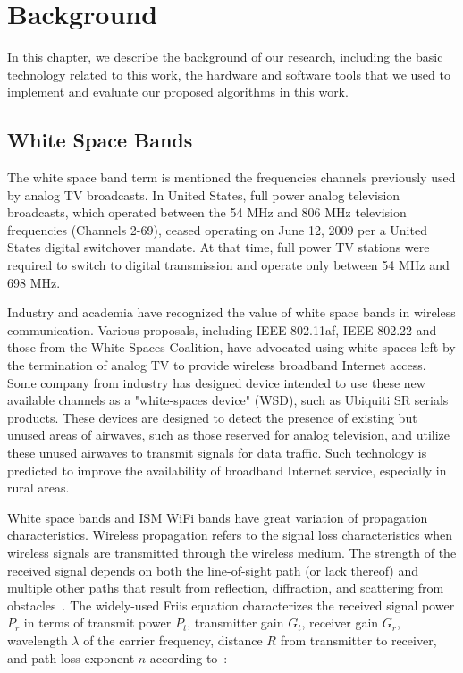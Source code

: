 \chapter{Background} 
\label{ch:background}

In this chapter, we describe the background of our research, 
including the basic technology related to this work, the 
hardware and software tools that we used to implement and evaluate 
our proposed algorithms in this work.


\section{White Space Bands}

The white space band term is mentioned the frequencies channels 
previously used by analog TV broadcasts. In United States, full 
power analog television broadcasts, which operated between the 
54 MHz and 806 MHz television frequencies (Channels 2-69), ceased 
operating on June 12, 2009 per a United States digital switchover 
mandate. At that time, full power TV stations were required to 
switch to digital transmission and operate only between 54 MHz 
and 698 MHz.~\cite{fccwhitespace} 

Industry and academia have recognized the value of white space 
bands in wireless communication. Various proposals, including 
IEEE 802.11af, IEEE 802.22 and those from the White Spaces 
Coalition, have advocated using white spaces left by the termination 
of analog TV to provide wireless broadband Internet access. Some 
company from industry has designed device intended to use these 
new available channels as a "white-spaces device" (WSD), such as 
Ubiquiti SR serials products. These devices are designed to detect 
the presence of existing but unused areas of airwaves, such as 
those reserved for analog television, and utilize these unused 
airwaves to transmit signals for data traffic. Such technology 
is predicted to improve the availability of broadband Internet 
service, especially in rural areas.

White space bands and ISM WiFi bands have great variation of 
propagation characteristics. Wireless propagation refers to 
the signal loss characteristics when wireless signals are 
transmitted through the wireless medium. The strength of the 
received signal depends on both the line-of-sight path (or lack 
thereof) and multiple other paths that result from reflection, 
diffraction, and scattering from obstacles~\cite{andersen1995propagation}. 
The widely-used Friis equation characterizes the received signal 
power $P_r$ in terms of transmit power $P_t$, transmitter gain 
$G_t$, receiver gain $G_r$, wavelength $\lambda$ of the carrier 
frequency, distance $R$ from transmitter to receiver, and path 
loss exponent $n$ according to~\cite{friis}:

